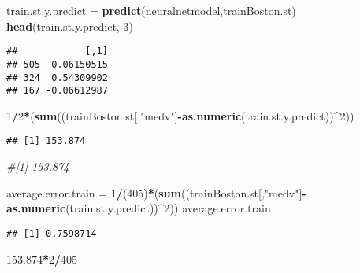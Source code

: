 \documentclass[
]{book}
\newenvironment{Shaded}{\begin{snugshade}}{\end{snugshade}}
\newcommand{\CommentTok}[1]{\textcolor[rgb]{0.56,0.35,0.01}{\textit{#1}}}
\newcommand{\DecValTok}[1]{\textcolor[rgb]{0.00,0.00,0.81}{#1}}
\newcommand{\FloatTok}[1]{\textcolor[rgb]{0.00,0.00,0.81}{#1}}
\newcommand{\KeywordTok}[1]{\textcolor[rgb]{0.13,0.29,0.53}{\textbf{#1}}}
\newcommand{\NormalTok}[1]{#1}
\newcommand{\OperatorTok}[1]{\textcolor[rgb]{0.81,0.36,0.00}{\textbf{#1}}}
\newcommand{\StringTok}[1]{\textcolor[rgb]{0.31,0.60,0.02}{#1}}
\begin{document}
\begin{Shaded}
\begin{Highlighting}[]
\NormalTok{train.st.y.predict =}\StringTok{ }\KeywordTok{predict}\NormalTok{(neuralnetmodel,trainBoston.st)}
\KeywordTok{head}\NormalTok{(train.st.y.predict, }\DecValTok{3}\NormalTok{)}
\end{Highlighting}
\end{Shaded}

\begin{verbatim}
##            [,1]
## 505 -0.06150515
## 324  0.54309902
## 167 -0.06612987
\end{verbatim}

\begin{Shaded}
\begin{Highlighting}[]
\DecValTok{1}\OperatorTok{/}\DecValTok{2}\OperatorTok{*}\NormalTok{(}\KeywordTok{sum}\NormalTok{((trainBoston.st[,}\StringTok{"medv"}\NormalTok{]}\OperatorTok{-}\KeywordTok{as.numeric}\NormalTok{(train.st.y.predict))}\OperatorTok{^}\DecValTok{2}\NormalTok{))}
\end{Highlighting}
\end{Shaded}

\begin{verbatim}
## [1] 153.874
\end{verbatim}

\begin{Shaded}
\begin{Highlighting}[]
\CommentTok{#[1] 153.874}
\end{Highlighting}
\end{Shaded}

\begin{Shaded}
\begin{Highlighting}[]
\NormalTok{average.error.train =}\StringTok{ }\DecValTok{1}\OperatorTok{/}\NormalTok{(}\DecValTok{405}\NormalTok{)}\OperatorTok{*}\NormalTok{(}\KeywordTok{sum}\NormalTok{((trainBoston.st[,}\StringTok{"medv"}\NormalTok{]}\OperatorTok{-}\KeywordTok{as.numeric}\NormalTok{(train.st.y.predict))}\OperatorTok{^}\DecValTok{2}\NormalTok{))}
\NormalTok{average.error.train}
\end{Highlighting}
\end{Shaded}

\begin{verbatim}
## [1] 0.7598714
\end{verbatim}

\begin{Shaded}
\begin{Highlighting}[]
\FloatTok{153.874}\OperatorTok{*}\DecValTok{2}\OperatorTok{/}\DecValTok{405}
\end{Highlighting}
\end{Shaded}
\end{document}
